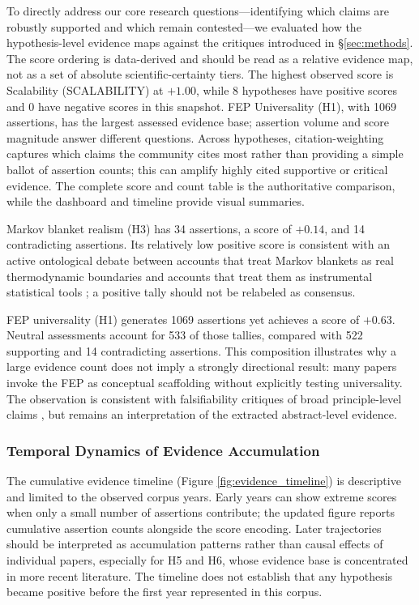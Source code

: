 \documentclass[
  english,
]{article}
\begin{document}
To directly address our core research questions---identifying which
claims are robustly supported and which remain contested---we evaluated
how the hypothesis-level evidence maps against the critiques introduced
in \S\ref{sec:methods}. The score ordering is data-derived and should be
read as a relative evidence map, not as a set of absolute
scientific-certainty tiers. The highest observed score is Scalability
(SCALABILITY) at \(+1.00\), while 8 hypotheses have positive scores and
0 have negative scores in this snapshot. FEP Universality (H1), with
1069 assertions, has the largest assessed evidence base; assertion
volume and score magnitude answer different questions. Across
hypotheses, citation-weighting captures which claims the community cites
most rather than providing a simple ballot of assertion counts; this can
amplify highly cited supportive or critical evidence. The complete score
and count table is the authoritative comparison, while the dashboard and
timeline provide visual summaries.

Markov blanket realism (H3) has 34 assertions, a score of \(+0.14\), and
14 contradicting assertions. Its relatively low positive score is
consistent with an active ontological debate between accounts that treat
Markov blankets as real thermodynamic boundaries and accounts that treat
them as instrumental statistical tools \citep{bruineberg2022emperor}; a
positive tally should not be relabeled as consensus.

FEP universality (H1) generates 1069 assertions yet achieves a score of
\(+0.63\). Neutral assessments account for 533 of those tallies,
compared with 522 supporting and 14 contradicting assertions. This
composition illustrates why a large evidence count does not imply a
strongly directional result: many papers invoke the FEP as conceptual
scaffolding without explicitly testing universality. The observation is
consistent with falsifiability critiques of broad principle-level claims
\citep{colombo2021free}, but remains an interpretation of the extracted
abstract-level evidence.

\subsubsection{Temporal Dynamics of Evidence
Accumulation}\label{temporal-dynamics-of-evidence-accumulation}

The cumulative evidence timeline (Figure \ref{fig:evidence_timeline}) is
descriptive and limited to the observed corpus years. Early years can
show extreme scores when only a small number of assertions contribute;
the updated figure reports cumulative assertion counts alongside the
score encoding. Later trajectories should be interpreted as accumulation
patterns rather than causal effects of individual papers, especially for
H5 and H6, whose evidence base is concentrated in more recent
literature. The timeline does not establish that any hypothesis became
positive before the first year represented in this corpus.
\end{document}

